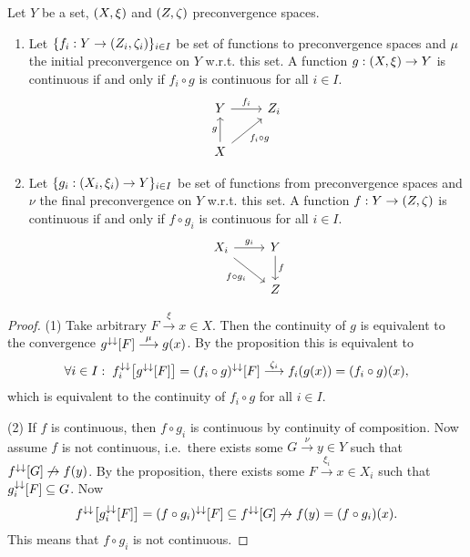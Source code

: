 \begin{corollary} \label{characteristicPropertyInitialFinalConvergence}
Let $Y$ be a set, $\sSet{X,\xi}$ and $\sSet{Z, \zeta}$ preconvergence spaces.
\begin{enumerate}
\item Let $\{f_i: Y\to \sSet{Z_i, \zeta_i}\}_{i\in I}$ be set of functions to preconvergence spaces and $\mu$ the initial preconvergence on $Y$ w.r.t. this set. A function $g: \sSet{X, \xi}\to Y$ is continuous \textup{if and only if} $f_i \circ g$ is continuous for all $i\in I$.
\[ \begin{tikzcd}
Y \ar[r, "f_i"] & Z_i \\ X \ar[u, "g"] \ar[ur, swap, "f_i\circ g"]
\end{tikzcd} \]
\item Let $\{g_i: \sSet{X_i, \xi_i} \to Y\}_{i\in I}$ be set of functions from preconvergence spaces and $\nu$ the final preconvergence on $Y$ w.r.t. this set. A function $f: Y\to \sSet{Z,\zeta}$ is continuous \textup{if and only if} $f\circ g_i$ is continuous for all $i\in I$.
\[ \begin{tikzcd}
X_i \ar[r, "g_i"] \ar[dr, swap, "f\circ g_i"] & Y \ar[d, "f"] \\ & Z
\end{tikzcd} \]
\end{enumerate}
\end{corollary}
\begin{proof}
(1) Take arbitrary $F\overset{\xi}{\longrightarrow} x\in X$. Then the continuity of $g$ is equivalent to the convergence $g^{\downarrow\downarrow}[F] \overset{\mu}{\longrightarrow} g(x)$. By the proposition this is equivalent to
\[ \forall i \in I: \; f_i^{\downarrow\downarrow}\big[g^{\downarrow\downarrow}[F]\big] = (f_i\circ g)^{\downarrow\downarrow}[F] \overset{\zeta_i}{\longrightarrow} f_i(g(x)) = (f_i\circ g)(x),  \]
which is equivalent to the continuity of $f_i\circ g$ for all $i\in I$.

(2) If $f$ is continuous, then $f\circ g_i$ is continuous by continuity of composition. Now assume $f$ is not continuous, i.e.\ there exists some $G\overset{\nu}{\longrightarrow} y\in Y$ such that $f^{\downarrow\downarrow}[G] \not\to f(y)$. By the proposition, there exists some $F\overset{\xi_i}{\longrightarrow} x\in X_i$ such that $g_i^{\downarrow\downarrow}[F] \subseteq G$. Now
\[ f^{\downarrow\downarrow}\big[g_i^{\downarrow\downarrow}[F]\big] = (f\circ g_i)^{\downarrow\downarrow}[F] \subseteq f^{\downarrow\downarrow}[G] \not\to f(y) = (f\circ g_i)(x). \]
This means that $f\circ g_i$ is not continuous.
\end{proof}

